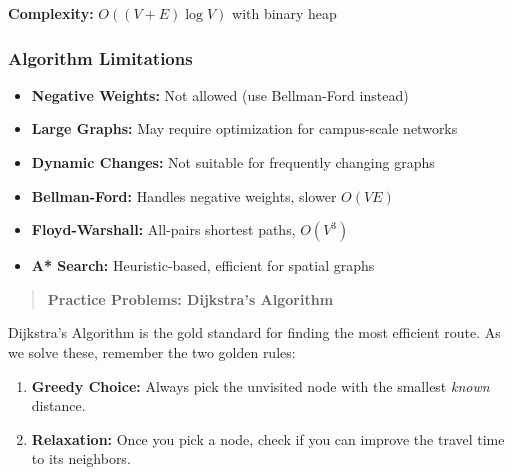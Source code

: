 \documentclass[
  letterpaper,
  DIV=11,
  numbers=noendperiod]{scrreprt}
\providecommand{\tightlist}{%
  \setlength{\itemsep}{0pt}\setlength{\parskip}{0pt}}
\begin{document}
\textbf{Complexity:} \(O((V+E) \log V)\) with binary heap

\subsubsection{Algorithm Limitations}\label{algorithm-limitations}

\begin{itemize}
\tightlist
\item
  \textbf{Negative Weights:} Not allowed (use Bellman-Ford instead)
\item
  \textbf{Large Graphs:} May require optimization for campus-scale
  networks
\item
  \textbf{Dynamic Changes:} Not suitable for frequently changing graphs
\end{itemize}

\begin{tcolorbox}[enhanced jigsaw, leftrule=.75mm, rightrule=.15mm, colback=white, colbacktitle=quarto-callout-note-color!10!white, arc=.35mm, opacityback=0, toptitle=1mm, bottomrule=.15mm, bottomtitle=1mm, titlerule=0mm, title=\textcolor{quarto-callout-note-color}{\faInfo}\hspace{0.5em}{Alternative Algorithms}, toprule=.15mm, left=2mm, coltitle=black, breakable, colframe=quarto-callout-note-color-frame, opacitybacktitle=0.6]

\begin{itemize}
\tightlist
\item
  \textbf{Bellman-Ford:} Handles negative weights, slower \(O(VE)\)
\item
  \textbf{Floyd-Warshall:} All-pairs shortest paths, \(O(V^3)\)
\item
  \textbf{A* Search:} Heuristic-based, efficient for spatial graphs
\end{itemize}

\end{tcolorbox}

\begin{quote}
\textbf{Practice Problems: Dijkstra's Algorithm}
\end{quote}

Dijkstra's Algorithm is the gold standard for finding the most efficient
route. As we solve these, remember the two golden rules:

\begin{enumerate}
\def\labelenumi{\arabic{enumi}.}
\tightlist
\item
  \textbf{Greedy Choice:} Always pick the unvisited node with the
  smallest \emph{known} distance.
\item
  \textbf{Relaxation:} Once you pick a node, check if you can improve
  the travel time to its neighbors.
\end{enumerate}
\end{document}
